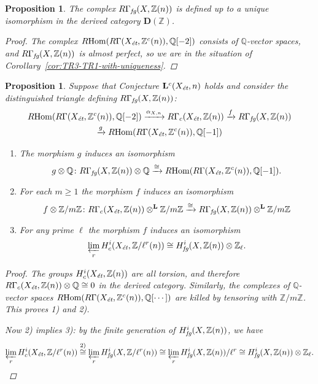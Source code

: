 \documentclass[leqno,12pt]{article}
\theoremstyle{plain}
\newtheorem{proposition}[theorem]{\indent\sc Proposition}
\theoremstyle{definition}
\DeclareMathOperator{\Hom}{Hom}
\newcommand{\QQ}{\mathbb{Q}}
\newcommand{\ZZ}{\mathbb{Z}}
\newcommand{\et}{\text{\it \'{e}t}}
\newcommand{\fg}{\text{\it fg}}
\newcommand{\RHom}{R\!\Hom}
\newcommand{\DZ}{{\mathbf{D} (\ZZ)}}
\begin{document}
\begin{proposition}
  \label{prop:RGamma-fg-well-defined}
  The complex $R\Gamma_\fg (X, \ZZ (n))$ is defined up to a unique isomorphism
  in the derived category $\DZ$.

  \begin{proof}
    The complex $\RHom (R\Gamma (X_\et, \ZZ^c (n)), \QQ [-2])$ consists of
    $\QQ$-vector spaces, and $R\Gamma_\fg (X, \ZZ (n))$ is almost perfect, so we
    are in the situation of Corollary~\ref{cor:TR3-TR1-with-uniqueness}.
  \end{proof}
\end{proposition}

\begin{proposition}
  \label{prop:tensoring-RGammafg-with-Z/m-and-Q}
  Suppose that Conjecture $\mathbf{L}^c (X_\et,n)$ holds and consider the
  distinguished triangle defining $R\Gamma_\fg (X, \ZZ (n))$:
  \begin{multline*}
    \RHom (R\Gamma (X_\et, \ZZ^c (n)), \QQ [-2]) \xrightarrow{\alpha_{X,n}}
    R\Gamma_c (X_\et, \ZZ (n)) \xrightarrow{f}
    R\Gamma_\fg (X, \ZZ (n)) \\
    \xrightarrow{g} \RHom (R\Gamma (X_\et, \ZZ^c (n)), \QQ [-1])
  \end{multline*}

  \begin{enumerate}
  \item[$1)$] The morphism $g$ induces an isomorphism
    \[ g\otimes \QQ\colon R\Gamma_\fg (X, \ZZ (n)) \otimes \QQ \xrightarrow{\cong}
      \RHom (R\Gamma (X_\et, \ZZ^c (n)), \QQ [-1]).\]

  \item[$2)$] For each $m \ge 1$ the morphism $f$ induces an
    isomorphism
    \[ f\otimes \ZZ/m\ZZ\colon
      R\Gamma_c (X_\et, \ZZ (n))\otimes^\mathbf{L} \ZZ/m\ZZ \xrightarrow{\cong}
      R\Gamma_\fg (X, \ZZ (n))\otimes^\mathbf{L} \ZZ/m\ZZ \]
    
  \item[$3)$] For any prime $\ell$ the morphism $f$ induces an isomorphism
    $$\varprojlim_r H_c^i (X_\et, \ZZ/\ell^r (n)) \cong H_\fg^i (X, \ZZ (n)) \otimes \ZZ_\ell.$$
  \end{enumerate}
  
  \begin{proof}
    The groups $H_c^i (X_\et, \ZZ (n))$ are all torsion, and therefore
    $R\Gamma_c (X_\et, \ZZ (n)) \otimes \QQ \cong 0$ in the derived
    category. Similarly, the complexes of $\QQ$-vector spaces
    $\RHom (R\Gamma (X_\et, \ZZ^c (n)), \QQ [\cdots])$ are killed by tensoring
    with $\ZZ/m\ZZ$.  This proves 1) and 2).

    Now 2) implies 3): by the finite generation of $H_\fg^i (X, \ZZ (n))$, we
    have
    \[ \varprojlim_r H_c^i (X_\et, \ZZ/\ell^r (n)) \stackrel{\text{2)}}{\cong}
      \varprojlim_r H_\fg^i (X, \ZZ/\ell^r (n)) \cong
      \varprojlim_r H_\fg^i (X, \ZZ (n))/\ell^r \cong
      H_\fg^i (X, \ZZ (n)) \otimes \ZZ_\ell. \qedhere \]
  \end{proof}
\end{proposition}
\end{document}
